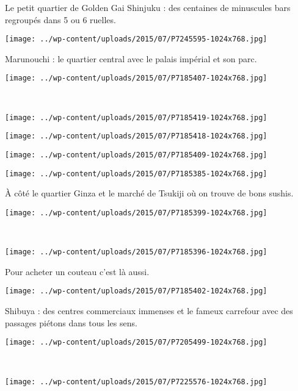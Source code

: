  Le petit quartier de Golden Gai Shinjuku : des centaines de minuscules bars regroupés dans 5 ou 6 ruelles. 
\begin{center} \texttt{[image: ../wp-content/uploads/2015/07/P7245595-1024x768.jpg]} \end{center}
\vspace{-\topsep}
\pagebreak

 Marunouchi : le quartier central avec le palais impérial et son parc. 
\begin{center} \texttt{[image: ../wp-content/uploads/2015/07/P7185407-1024x768.jpg]} \end{center}
~\\
\begin{center} \texttt{[image: ../wp-content/uploads/2015/07/P7185419-1024x768.jpg]} \end{center}
\begin{center} \texttt{[image: ../wp-content/uploads/2015/07/P7185418-1024x768.jpg]} \end{center}
\begin{center} \texttt{[image: ../wp-content/uploads/2015/07/P7185409-1024x768.jpg]} \end{center}
\begin{center} \texttt{[image: ../wp-content/uploads/2015/07/P7185385-1024x768.jpg]} \end{center}

 \`A côté le quartier Ginza et le marché de Tsukiji où on trouve de bons sushis. 
\begin{center} \texttt{[image: ../wp-content/uploads/2015/07/P7185399-1024x768.jpg]} \end{center}
\vspace{-\topsep}
\pagebreak
~\\
\begin{center} \texttt{[image: ../wp-content/uploads/2015/07/P7185396-1024x768.jpg]} \end{center}

 Pour acheter un couteau c'est là aussi.
\begin{center} \texttt{[image: ../wp-content/uploads/2015/07/P7185402-1024x768.jpg]} \end{center}
\vspace{-\topsep}
\pagebreak

  Shibuya : des centres commerciaux immenses et le fameux carrefour avec des passages piétons dans tous les sens. 
\begin{center} \texttt{[image: ../wp-content/uploads/2015/07/P7205499-1024x768.jpg]} \end{center}
~
\begin{center} \texttt{[image: ../wp-content/uploads/2015/07/P7225576-1024x768.jpg]} \end{center}
\vspace{-\topsep}
\pagebreak

